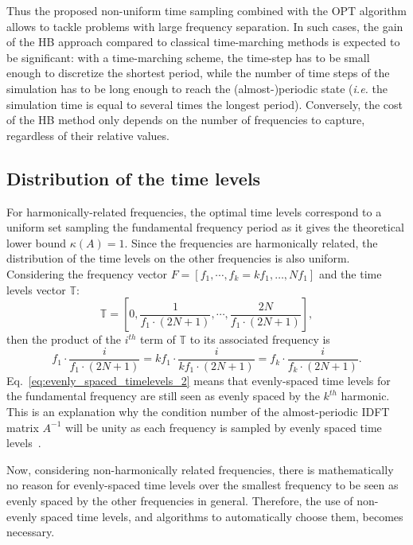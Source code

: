 Thus the proposed non-uniform time sampling combined with the OPT
algorithm allows to tackle problems with large frequency
separation. In such cases, the gain of the HB approach compared
to classical time-marching methods is expected to be significant: with
a time-marching scheme, the time-step has to be small enough to
discretize the shortest period, while the number of time steps of the
simulation has to be long enough to reach the (almost-)periodic state
(\emph{i.e.}  the simulation time is equal to several
times the longest period). Conversely, the cost of the HB method only
depends on the number of frequencies to capture, regardless of their
relative values.

\subsection{Distribution of the time levels}

For harmonically-related frequencies, the optimal time levels
correspond to a uniform set sampling the fundamental frequency period
as it gives the theoretical lower bound $\kappa (A) = 1$. Since the
frequencies are harmonically related, the distribution of the time
levels on the other frequencies is also uniform. Considering the
frequency vector $F = \left[f_1, \cdots,f_k= kf_1,\ldots,Nf_1 \right]$
and the time levels vector
$\mathbb{T}$:%
\begin{equation}
  \mathbb{T} = \left[0, \frac{1}{f_1\cdot(2N+1)}, \cdots,  \frac{2N}{f_1\cdot(2N+1)} \right],
  \label{eq:evenly_spaced_timelevels}
\end{equation}
then the product of the $i^{th}$ term of $\mathbb{T}$ to its
associated frequency is
\begin{equation}
  f_1 \cdot \frac{i}{f_1\cdot(2N+1)} = k f_1 \cdot \frac{i}{k f_1 \cdot (2N+1)} = f_k \cdot \frac{i}{f_k\cdot(2N+1)}.
  \label{eq:evenly_spaced_timelevels_2}
\end{equation}
Eq.~\eqref{eq:evenly_spaced_timelevels_2} means that evenly-spaced
time levels for the fundamental frequency are still seen as evenly
spaced by the $k^{th}$ harmonic. This is an explanation why the
condition number of the almost-periodic IDFT matrix $A^{-1}$ will be
unity as each frequency is sampled by evenly spaced time
levels~\cite{Brambilla:1999fk}.

Now, considering non-harmonically related frequencies, there is
mathematically no reason for evenly-spaced time levels over the
smallest frequency to be seen as evenly spaced by the other frequencies
in general. Therefore, the use of non-evenly spaced time levels,
  and algorithms to automatically choose them, becomes necessary.

